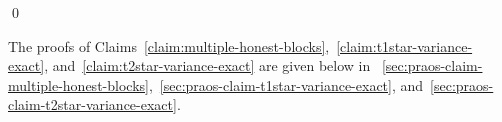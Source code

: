 


\hfill\qed

The proofs of Claims~\ref{claim:multiple-honest-blocks},~\ref{claim:t1star-variance-exact}, 
and~\ref{claim:t2star-variance-exact} 
are given below in \Section~\ref{sec:praos-claim-multiple-honest-blocks},~\ref{sec:praos-claim-t1star-variance-exact}, and~\ref{sec:praos-claim-t2star-variance-exact}.




